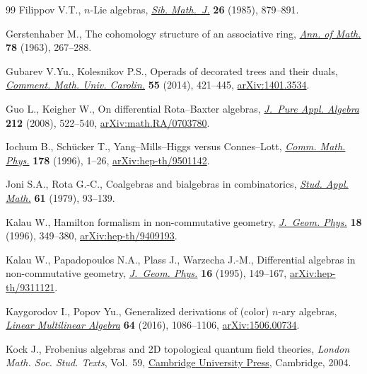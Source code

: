\documentclass[pdftex]{sigma}
\numberwithin{equation}{section}
\begin{document}
\begin{thebibliography}{99}
Filippov V.T., {$n$}-{L}ie algebras, \href{https://doi.org/10.1007/BF00969110}{\textit{Sib. Math.~J.}} \textbf{26} (1985),
 879--891.

Gerstenhaber M., The cohomology structure of an associative ring, \href{https://doi.org/10.2307/1970343}{\textit{Ann.
 of Math.}} \textbf{78} (1963), 267--288.

Gubarev V.Yu., Kolesnikov P.S., Operads of decorated trees and their duals,
 \href{https://doi.org/10.1215/00294527-2798700}{\textit{Comment. Math. Univ. Carolin.}} \textbf{55} (2014), 421--445,
 \href{https://arxiv.org/abs/1401.3534}{arXiv:1401.3534}.

Guo L., Keigher W., On differential {R}ota--{B}axter algebras, \href{https://doi.org/10.1016/j.jpaa.2007.06.008}{\textit{J.~Pure
 Appl. Algebra}} \textbf{212} (2008), 522--540, \href{https://arxiv.org/abs/math.RA/0703780}{arXiv:math.RA/0703780}.

Iochum B., Sch\"ucker T., Yang--{M}ills--{H}iggs versus {C}onnes--{L}ott,
 \href{https://doi.org/10.1007/BF02104906}{\textit{Comm. Math. Phys.}} \textbf{178} (1996), 1--26,
 \href{https://arxiv.org/abs/hep-th/9501142}{arXiv:hep-th/9501142}.

Joni S.A., Rota G.-C., Coalgebras and bialgebras in combinatorics, \href{https://doi.org/10.1002/sapm197961293}{\textit{Stud.
 Appl. Math.}} \textbf{61} (1979), 93--139.

Kalau W., Hamilton formalism in non-commutative geometry, \href{https://doi.org/10.1016/0393-0440(95)00015-1}{\textit{J.~Geom.
 Phys.}} \textbf{18} (1996), 349--380, \href{https://arxiv.org/abs/hep-th/9409193}{arXiv:hep-th/9409193}.

Kalau W., Papadopoulos N.A., Plass J., Warzecha J.-M., Differential algebras in
 non-commutative geometry, \href{https://doi.org/10.1016/0393-0440(94)00025-Y}{\textit{J.~Geom. Phys.}} \textbf{16} (1995),
 149--167, \href{https://arxiv.org/abs/hep-th/9311121}{arXiv:hep-th/9311121}.

Kaygorodov I., Popov Yu., Generalized derivations of (color) {$n$}-ary algebras,
 \href{https://doi.org/10.1080/03081087.2015.1072492}{\textit{Linear Multilinear Algebra}} \textbf{64} (2016), 1086--1106,
 \href{https://arxiv.org/abs/1506.00734}{arXiv:1506.00734}.

Kock J., Frobenius algebras and 2{D} topological quantum field theories,
 \textit{London Math. Soc. Stud. Texts}, Vol.~59, \href{https://doi.org/10.1017/CBO9780511615443}{Cambridge University Press},
 Cambridge, 2004.


\end{thebibliography}
\end{document}
